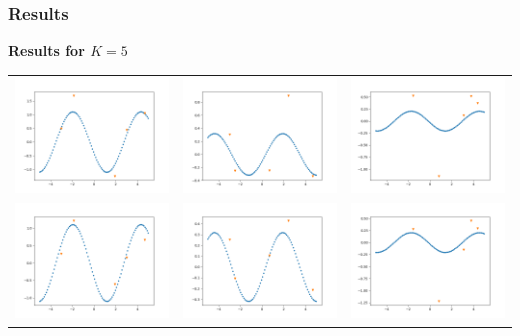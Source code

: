 \documentclass[a4paper]{article}
\begin{document}
\subsubsection{Results}
\textbf{Results for $K = 5$}
\begin{table}[h!]
\centering
\begin{tabular}{c c c}
\includegraphics[width=5cm]{5shot1_1.png} & \includegraphics[width=5cm]{5shot1_2.png} & \includegraphics[width=5cm]{5shot1_3.png} \\
\includegraphics[width=5cm]{5shot5_1.png} & \includegraphics[width=5cm]{5shot5_2.png} & \includegraphics[width=5cm]{5shot5_3.png} \\
\end{tabular}
\end{table}
\end{document}
